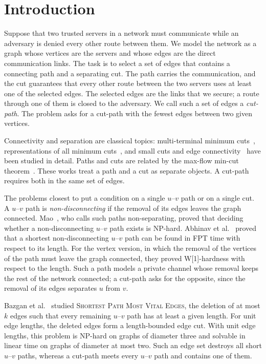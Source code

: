 \section{Introduction}
\label{sec:introduction}

Suppose that two trusted servers in a network must communicate while an adversary is denied every other route between them.
We model the network as a graph whose vertices are the servers and whose edges are the direct communication links.
The task is to select a set of edges that contains a connecting path and a separating cut.
The path carries the communication, and the cut guarantees that every other route between the two servers uses at least one of the selected edges.
The selected edges are the links that we secure; a route through one of them is closed to the adversary.
We call such a set of edges a \emph{cut-path}.
The \MinCutPath{} problem asks for a cut-path with the fewest edges between two given vertices.

Connectivity and separation are classical topics: multi-terminal minimum cuts~\cite{GomoryHu1961}, representations of all minimum cuts~\cite{NagamochiKameda1996}, and small cuts and edge connectivity~\cite{Mehlhorn2017Certifying} have been studied in detail.
Paths and cuts are related by the max-flow min-cut theorem~\cite{Cormen2022}.
These works treat a path and a cut as separate objects.
A cut-path requires both in the same set of edges.

The problems closest to \MinCutPath{} put a condition on a single $u$--$v$ path or on a single cut.
A $u$--$v$ path is \emph{non-disconnecting} if the removal of its edges leaves the graph connected.
Mao~\cite{Mao2021NonSeparating}, who calls such paths non-separating, proved that deciding whether a non-disconnecting $u$--$v$ path exists is NP-hard.
Abhinav et al.~\cite{Abhinav2022NonSeparating} proved that a shortest non-disconnecting $u$--$v$ path can be found in FPT time with respect to its length.
For the vertex version, in which the removal of the vertices of the path must leave the graph connected, they proved W[1]-hardness with respect to the length.
Such a path models a private channel whose removal keeps the rest of the network connected; a cut-path asks for the opposite, since the removal of its edges separates $u$ from $v$.

Bazgan et al.~\cite{Bazgan2019MostVital} studied \textsc{Shortest Path Most Vital Edges}, the deletion of at most $k$ edges such that every remaining $u$--$v$ path has at least a given length.
For unit edge lengths, the deleted edges form a length-bounded edge cut.
With unit edge lengths, this problem is NP-hard on graphs of diameter three and solvable in linear time on graphs of diameter at most two.
Such an edge set destroys all short $u$--$v$ paths, whereas a cut-path meets every $u$--$v$ path and contains one of them.

